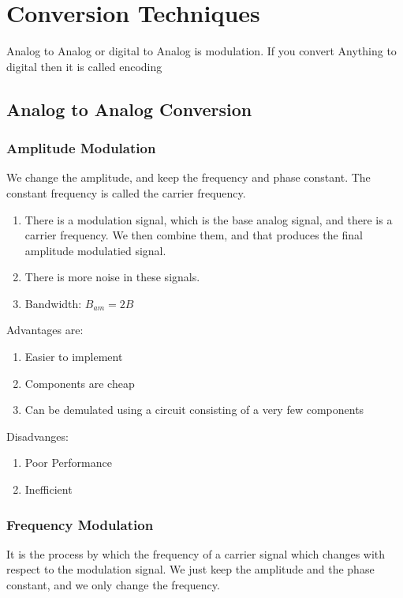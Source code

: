 \documentclass[11pt]{article}
\begin{document}
\clearpage
\tableofcontents
\clearpage

\section{Conversion Techniques}
Analog to Analog or digital to Analog is modulation. If you convert Anything to digital then it is called encoding

\subsection{Analog to Analog Conversion}
\subsubsection{Amplitude Modulation}
We change the amplitude, and keep the frequency and phase constant. The constant frequency is called the carrier frequency.

\begin{enumerate}
	\item There is a modulation signal, which is the base analog signal, and there is a carrier frequency. We then combine them, and that produces the final amplitude modulatied signal.
	\item There is more noise in these signals.
	\item Bandwidth: $B_{am} = 2B$
\end{enumerate}

Advantages are:
\begin{enumerate}
	\item Easier to implement
	\item Components are cheap
	\item Can be demulated using a circuit consisting of a very few components
\end{enumerate}

Disadvanges:

\begin{enumerate}
	\item Poor Performance
 \item Inefficient
\end{enumerate}


\subsubsection{Frequency Modulation}
It is the process by which the frequency of a carrier signal which changes with respect to the modulation signal. We just keep the amplitude and the phase constant, and we only change the frequency.
\end{document}
